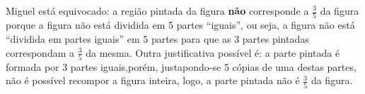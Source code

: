 \documentclass[10 pt,usenames,dvipsnames, oneside]{article}
\begin{document}
\begin{center}
\end{center}

\ifdefined\prof

\begin{solucao}

Miguel está equivocado: a região pintada da figura   {\bf não}   corresponde a   $\frac{3}{5}$ da figura porque a figura não está dividida em 5 partes ``iguais'', ou seja, a figura não está ``dividida em partes iguais'' em 5 partes para que as 3 partes pintadas correspondam a   $\frac{3}{5}$ da mesma. Outra justificativa possível é: a parte pintada é formada por 3 partes iguais,porém,  justapondo-se 5 cópias de uma destas partes, não é possível recompor a figura inteira, logo, a parte pintada não é $\frac{3}{5}$ da figura.


\end{solucao}
\fi
\end{document}
